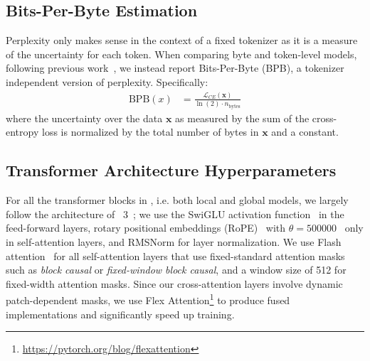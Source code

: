 \documentclass[]{fairmeta}
\begin{document}
\subsection{Bits-Per-Byte Estimation}
Perplexity only makes sense in the context of a fixed tokenizer as it is a measure of the uncertainty for each token. When comparing byte and token-level models, following previous work~\citep{xue2022byt5, yu2023megabyte, wang2024mambabyte}, we instead report Bits-Per-Byte (BPB), a tokenizer independent version of perplexity. Specifically:
\begin{align}
    \text{BPB}(x)&= \frac{\mathcal{L}_{CE}(\pmb{x})}{\ln(2)\cdot n_{\text{bytes}}}
\end{align}
where the uncertainty over the data $\pmb{x}$ as measured by the sum of the cross-entropy loss is normalized by the total number of bytes in $\pmb{x}$ and a constant. 

\subsection{Transformer Architecture Hyperparameters} For all the transformer blocks in \model{}, i.e. both local and global models, we largely follow the architecture of \llama{}~3~\citep{dubey2024llama}; we use the SwiGLU activation function~\citep{swiglu} in the feed-forward layers, rotary positional embeddings (RoPE)~\citep{RoPe} with $\theta=500000$~\citep{xiong2024effective} only in self-attention layers, and RMSNorm \citep{RMSNorm} for layer normalization. We use Flash attention~\citep{dao2022flashattention} for all self-attention layers that use fixed-standard attention masks such as \textit{block causal} or \textit{fixed-window block causal}, and a window size of 512 for fixed-width attention masks. Since our cross-attention layers involve dynamic patch-dependent masks, we use Flex Attention\footnote{\url{https://pytorch.org/blog/flexattention}} to produce fused implementations and significantly speed up training.
\end{document}
